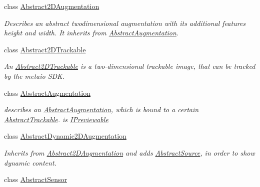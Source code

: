 \begin{DoxyCompactItemize}
\item 
class \hyperlink{class_a_rdev_kit_1_1_model_1_1_project_1_1_abstract2_d_augmentation}{Abstract2\-D\-Augmentation}
\begin{DoxyCompactList}\small\item\em Describes an abstract twodimensional augmentation with its additional features height and width. It inherits from \hyperlink{class_a_rdev_kit_1_1_model_1_1_project_1_1_abstract_augmentation}{Abstract\-Augmentation}. \end{DoxyCompactList}\item 
class \hyperlink{class_a_rdev_kit_1_1_model_1_1_project_1_1_abstract2_d_trackable}{Abstract2\-D\-Trackable}
\begin{DoxyCompactList}\small\item\em An \hyperlink{class_a_rdev_kit_1_1_model_1_1_project_1_1_abstract2_d_trackable}{Abstract2\-D\-Trackable} is a two-\/dimensional trackable image, that can be tracked by the metaio S\-D\-K. \end{DoxyCompactList}\item 
class \hyperlink{class_a_rdev_kit_1_1_model_1_1_project_1_1_abstract_augmentation}{Abstract\-Augmentation}
\begin{DoxyCompactList}\small\item\em describes an \hyperlink{class_a_rdev_kit_1_1_model_1_1_project_1_1_abstract_augmentation}{Abstract\-Augmentation}, which is bound to a certain \hyperlink{class_a_rdev_kit_1_1_model_1_1_project_1_1_abstract_trackable}{Abstract\-Trackable}. is \hyperlink{interface_a_rdev_kit_1_1_model_1_1_project_1_1_i_previewable}{I\-Previewable} \end{DoxyCompactList}\item 
class \hyperlink{class_a_rdev_kit_1_1_model_1_1_project_1_1_abstract_dynamic2_d_augmentation}{Abstract\-Dynamic2\-D\-Augmentation}
\begin{DoxyCompactList}\small\item\em Inherits from \hyperlink{class_a_rdev_kit_1_1_model_1_1_project_1_1_abstract2_d_augmentation}{Abstract2\-D\-Augmentation} and adds \hyperlink{class_a_rdev_kit_1_1_model_1_1_project_1_1_abstract_source}{Abstract\-Source}, in order to show dynamic content. \end{DoxyCompactList}\item 
class \hyperlink{class_a_rdev_kit_1_1_model_1_1_project_1_1_abstract_sensor}{Abstract\-Sensor}

\end{DoxyCompactItemize}
